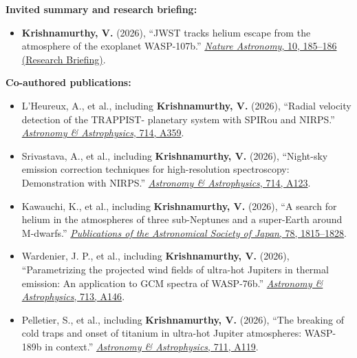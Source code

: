 \documentclass[10pt,a4paper]{article}
\begin{document}
\textbf{Invited summary and research briefing:}

\begin{itemize}

\item
\textbf{Krishnamurthy, V.} (2026),
``JWST tracks helium escape from the atmosphere of the exoplanet WASP-107b.''
\href{https://doi.org/10.1038/s41550-025-02722-4}
{\emph{Nature Astronomy}, 10, 185--186 (Research Briefing)}.

\end{itemize}


\textbf{Co-authored publications:}

\begin{itemize}

\item
\begin{sloppypar}
L'Heureux, A., et al., including \textbf{Krishnamurthy, V.} (2026),
``Radial velocity detection of the TRAPPIST- planetary system with
SPIRou and NIRPS.''
\href{https://doi.org/10.1051/0004-6361/202659920}
{\emph{Astronomy \& Astrophysics}, 714, A359}.
\end{sloppypar}

\item
Srivastava, A., et al., including \textbf{Krishnamurthy, V.} (2026),
``Night-sky emission correction techniques for high-resolution spectroscopy:
Demonstration with NIRPS.''
\href{https://doi.org/10.1051/0004-6361/202556093}
{\emph{Astronomy \& Astrophysics}, 714, A123}.

\item
Kawauchi, K., et al., including \textbf{Krishnamurthy, V.} (2026),
``A search for helium in the atmospheres of three sub-Neptunes and a
super-Earth around M-dwarfs.''
\href{https://doi.org/10.1093/pasj/psag104}
{\emph{Publications of the Astronomical Society of Japan},
78, 1815--1828}.

\item
Wardenier, J. P., et al., including \textbf{Krishnamurthy, V.} (2026),
``Parametrizing the projected wind fields of ultra-hot Jupiters in
thermal emission: An application to GCM spectra of WASP-76b.''
\href{https://doi.org/10.1051/0004-6361/202659973}
{\emph{Astronomy \& Astrophysics}, 713, A146}.

\item
Pelletier, S., et al., including \textbf{Krishnamurthy, V.} (2026),
``The breaking of cold traps and onset of titanium in ultra-hot Jupiter
atmospheres: WASP-189b in context.''
\href{https://doi.org/10.1051/0004-6361/202659885}
{\emph{Astronomy \& Astrophysics}, 711, A119}.


\end{itemize}
\end{document}
